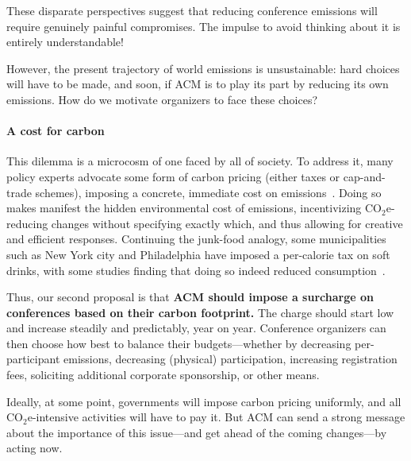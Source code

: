 \documentclass[12pt]{article}
\newcommand{\bcp}[1]{\ifdraft{\bf [bcp: #1]}\fi}
\newcommand{\COtwoE}{CO$_2$e}
\newcommand{\PARAGRAPH}{\paragraph*}
\begin{document}
%
These disparate perspectives suggest that reducing conference emissions will
require genuinely painful compromises.  The impulse to avoid thinking about
it is entirely understandable!

However, the present trajectory of world emissions is unsustainable: hard
choices will have to be made, and soon, if ACM is to play its part by
reducing its own emissions. How do we motivate organizers to face these
choices? 

\PARAGRAPH{A cost for carbon}
%
This dilemma is a microcosm of one faced by all of society. To address it,
many policy experts advocate some form of carbon pricing (either taxes or
cap-and-trade schemes), imposing a concrete, immediate cost on
emissions~\cite{carbonprice}. Doing so makes manifest the hidden
environmental cost of emissions, incentivizing
{\COtwoE}-reducing changes without specifying exactly which, and thus
allowing for creative and efficient responses. Continuing the junk-food
analogy, some 
municipalities such as New York city and Philadelphia have imposed a
per-calorie tax on soft drinks, with some studies finding that doing so
indeed reduced consumption~\cite{sodatax}.

Thus, our second proposal is that {\bf ACM should impose a surcharge on
  conferences based on their carbon footprint.}  The charge should start low 
and increase steadily and predictably, year on year.
%
Conference organizers can then choose how best to balance their
budgets---whether 
by decreasing per-participant emissions, decreasing (physical)
participation, increasing registration fees, soliciting additional corporate
sponsorship, or other means.

Ideally, at some point, governments will impose carbon pricing uniformly,
and all {\COtwoE}-intensive activities will have to pay it. But ACM can send a
strong message about the importance of this issue---and get ahead of the
coming changes---by acting now. 
\end{document}

